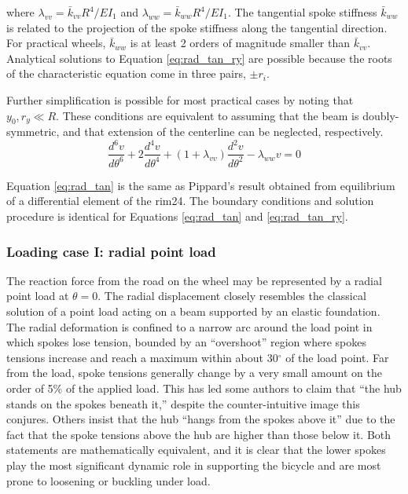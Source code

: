\documentclass[../thesis.tex]{subfiles}
\newcommand{\dt}[2]{\frac{d^#2#1}{d\theta^#2}}
\begin{document}
where $\lambda_{vv}=\bar{k}_{vv}R^4/EI_1$ and $\lambda_{ww}=\bar{k}_{ww}R^4/EI_1$. The tangential spoke stiffness $\bar{k}_{ww}$ is related to the projection of the spoke stiffness along the tangential direction. For practical wheels, $\bar{k}_{ww}$ is at least 2 orders of magnitude smaller than $\bar{k}_{vv}$. Analytical solutions to Equation \eqref{eq:rad_tan_ry} are possible because the roots of the characteristic equation come in three pairs, $\pm r_i$.

Further simplification is possible for most practical cases by noting that $y_0,r_y \ll R$. These conditions are equivalent to assuming that the beam is doubly-symmetric, and that extension of the centerline can be neglected, respectively.
\begin{equation}
\label{eq:rad_tan}
\dt{v}{6} + 2\dt{v}{4}+(1+\lambda_{vv})\dt{v}{2} - \lambda_{ww}v=0
\end{equation}

Equation \eqref{eq:rad_tan} is the same as Pippard’s result obtained from equilibrium of a differential element of the rim24. The boundary conditions and solution procedure is identical for Equations \eqref{eq:rad_tan} and \eqref{eq:rad_tan_ry}.

\subsubsection{Loading case I: radial point load}

The reaction force from the road on the wheel may be represented by a radial point load at $\theta=0$. The radial displacement closely resembles the classical solution of a point load acting on a beam supported by an elastic foundation\cite{Hetenyi}. The radial deformation is confined to a narrow arc around the load point in which spokes lose tension, bounded by an ``overshoot'' region where spokes tensions increase and reach a maximum within about 30$^{\circ}$ of the load point. Far from the load, spoke tensions generally change by a very small amount on the order of 5\% of the applied load. This has led some authors to claim that ``the hub stands on the spokes beneath it,'' despite the counter-intuitive image this conjures\cite{Brandt}. Others insist that the hub ``hangs from the spokes above it'' due to the fact that the spoke tensions above the hub are higher than those below it.  Both statements are mathematically equivalent, and it is clear that the lower spokes play the most significant dynamic role in supporting the bicycle and are most prone to loosening or buckling under load.
\end{document}
